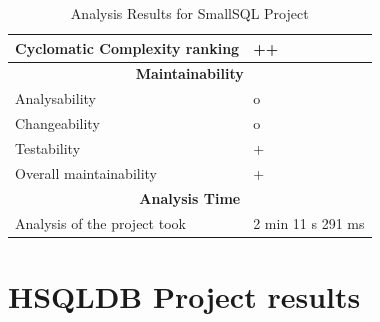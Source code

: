 \documentclass[11pt]{report}
\begin{document}
\begin{table}[H]
\begin{tabular}{|l|l|}
        \hline
        Cyclomatic Complexity ranking & ++ \\
        \hline
        \multicolumn{2}{|c|}{\textbf{Maintainability}} \\
        \hline
        Analysability & o \\
        \hline
        Changeability & o \\
        \hline
        Testability & + \\
        \hline
        Overall maintainability & + \\
        \hline
        \multicolumn{2}{|c|}{\textbf{Analysis Time}} \\
        \hline
        Analysis of the project took & 2 min 11 s 291 ms \\
        \hline
    \end{tabular}
    \caption{Analysis Results for SmallSQL Project}
    \label{tab:analysis-results}
\end{table}

\section{HSQLDB Project results}
\label{sec:big-sql}
\end{document}
